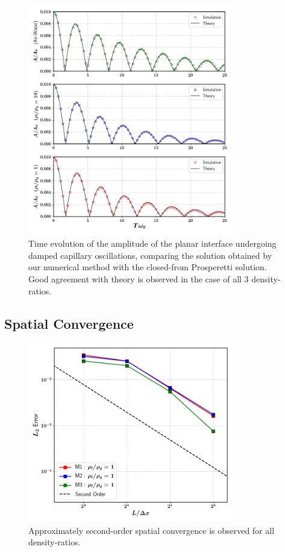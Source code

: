 \begin{figure}[h!]
    \centering
    \includegraphics[width = 0.8\textwidth]{plots/capwave/compare_sagar.png}
    \caption{Time evolution of the amplitude of the planar interface undergoing damped capillary oscillations, comparing the solution obtained by our numerical method with the closed-from Prosperetti solution. Good agreement with theory is observed in the case of all 3 density-ratios. }
    \label{capwave_sagar}
\end{figure}


\subsection*{Spatial Convergence}
\blindtext

\begin{figure}[h!]
    \centering
    \includegraphics[width = 0.8\textwidth]{plots/capwave/conv_r1.png}
    \caption{Approximately second-order spatial convergence is observed for all density-ratios.}
    \label{conv_r1}
\end{figure}

